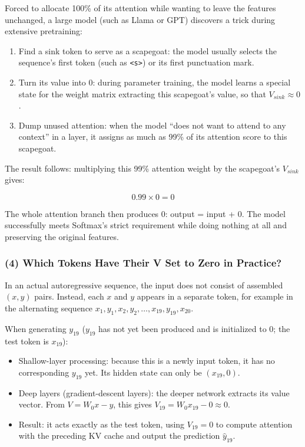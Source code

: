 Forced to allocate 100\% of its attention while wanting to leave the features unchanged, a large model (such as Llama or GPT) discovers a trick during extensive pretraining:

\begin{enumerate}
\def\labelenumi{\arabic{enumi}.}
\tightlist
\item
  Find a sink token to serve as a scapegoat: the model usually selects the sequence's first token (such as \texttt{\textless{}s\textgreater{}}) or its first punctuation mark.
\item
  Turn its value into 0: during parameter training, the model learns a special state for the weight matrix extracting this scapegoat's value, so that \(V_{sink} \approx 0\).
\item
  Dump unused attention: when the model ``does not want to attend to any context'' in a layer, it assigns as much as 99\% of its attention score to this scapegoat.
\end{enumerate}

The result follows: multiplying this 99\% attention weight by the scapegoat's \(V_{sink}\) gives:

\[
0.99 \times 0 = 0
\]

The whole attention branch then produces 0: output = input + 0. The model successfully meets Softmax's strict requirement while doing nothing at all and preserving the original features.

\hypertarget{which-tokens-have-their-v-set-to-zero-in-practice}{%
\subsubsection{(4) Which Tokens Have Their V Set to Zero in Practice?}\label{which-tokens-have-their-v-set-to-zero-in-practice}}

In an actual autoregressive sequence, the input does not consist of assembled \((x,y)\) pairs. Instead, each \(x\) and \(y\) appears in a separate token, for example in the alternating sequence \(x_1,y_1,x_2,y_2,\ldots,x_{19},y_{19},x_{20}\).

When generating \(y_{19}\) (\(y_{19}\) has not yet been produced and is initialized to \(0\); the test token is \(x_{19}\)):

\begin{itemize}
\tightlist
\item
  Shallow-layer processing: because this is a newly input token, it has no corresponding \(y_{19}\) yet. Its hidden state can only be \((x_{19},0)\).
\item
  Deep layers (gradient-descent layers): the deeper network extracts its value vector. From \(V = W_0x - y\), this gives \(V_{19}=W_0x_{19}-0 \approx 0\).
\item
  Result: it acts exactly as the test token, using \(V_{19}=0\) to compute attention with the preceding KV cache and output the prediction \(\hat{y}_{19}\).
\end{itemize}

